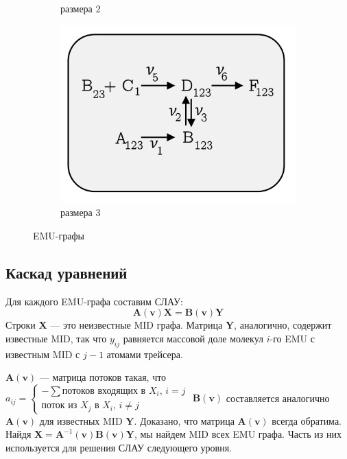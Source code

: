 \documentclass[14pt, a4paper]{extreport}
\begin{document}
\begin{figure}[b]
\begin{subfigure}{.3\linewidth}
		\caption{размера 2}
		\label {emu_graph_2}
	\end{subfigure}
	\begin{subfigure}{.3\linewidth}
		\includegraphics[width=1.2\linewidth]{EMU_graph_3.png}
		\caption{размера 3}
		\label {emu_graph_3}
	\end{subfigure}
	\caption{EMU-графы}
	\label{emu_graph}
\end{figure}

\clearpage

\subsection{Каскад уравнений}
Для каждого EMU-графа составим СЛАУ:
$$\mathbf{A}(\mathbf{v}) \mathbf{X} = \mathbf{B}(\mathbf{v}) \mathbf{Y}$$
Строки $\mathbf{X}$ --- это неизвестные MID графа. Матрица $\mathbf{Y}$, аналогично, содержит известные MID, так что $y_{ij}$ равняется массовой доле молекул $i$-го EMU с известным MID с $j - 1$ атомами трейсера.

\noindent $\mathbf{A}(\mathbf{v})$ --- матрица потоков такая, что 
$a_{ij} = 
\begin{cases} 
	\text{$-\sum$потоков входящих в $X_i$, $i=j$}\\
	\text{поток из $X_j$ в $X_i$, $i\neq{}j$}
	\end{cases}
	$
 $\mathbf{B}(\mathbf{v})$ составляется аналогично $\mathbf{A}(\mathbf{v})$ для известных MID $\mathbf{Y}$. Доказано, что матрица $\mathbf{A}(\mathbf{v})$ всегда обратима\cite{anderson_1983}.
Найдя $\mathbf{X} = \mathbf{A}^{-1}(\mathbf{v})\mathbf{B}(\mathbf{v})\mathbf{Y}$, мы найдем MID всех EMU графа. Часть из них используется для решения СЛАУ следующего уровня.
\end{document}
